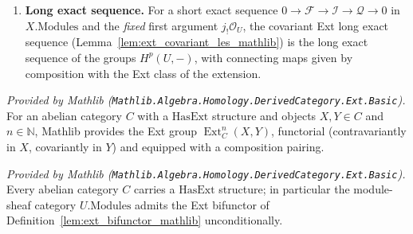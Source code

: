 \begin{definition}
\begin{enumerate}
    Lemma~\ref{lem:ext_eq_zero_of_injective_mathlib}. Since \(\mathcal{I}\) is exactly
    the second argument of \(\operatorname{Ext}^{n+1}(j_!\mathcal{O}_U, \mathcal{I})\),
    this yields \(H^{n+1}(U, \mathcal{I}) = 0\) directly: the short exact sequence stays
    in \(X.\mathrm{Modules}\), no restriction is taken, and
    restriction-preserves-injectives is not needed.
  \item \textbf{Long exact sequence.} For a short exact sequence \(0 \to \mathcal{F}
    \to \mathcal{I} \to \mathcal{Q} \to 0\) in \(X.\mathrm{Modules}\) and the
    \emph{fixed} first argument \(j_!\mathcal{O}_U\), the covariant Ext long exact
    sequence (Lemma~\ref{lem:ext_covariant_les_mathlib}) is the long exact sequence of
    the groups \(H^p(U, -)\), with connecting maps given by composition with the Ext
    class of the extension.
  \end{enumerate}
\end{definition}

\begin{definition}
  \label{lem:ext_bifunctor_mathlib}
  \mathlibok
  \textit{Provided by Mathlib
  (\texttt{Mathlib.Algebra.Homology.DerivedCategory.Ext.Basic}).}
  For an abelian category \(C\) with a \(\mathrm{HasExt}\) structure and objects \(X, Y
  \in C\) and \(n \in \mathbb{N}\), Mathlib provides the Ext group
  \(\operatorname{Ext}^n_C(X, Y)\), functorial (contravariantly in \(X\), covariantly in
  \(Y\)) and equipped with a composition pairing.
\end{definition}

\begin{lemma}
  \label{lem:hasext_standard_mathlib}
  \mathlibok
  \textit{Provided by Mathlib
  (\texttt{Mathlib.Algebra.Homology.DerivedCategory.Ext.Basic}).}
  Every abelian category \(C\) carries a \(\mathrm{HasExt}\) structure; in particular the
  module-sheaf category \(U.\mathrm{Modules}\) admits the Ext bifunctor of
  Definition~\ref{lem:ext_bifunctor_mathlib} unconditionally.
\end{lemma}

